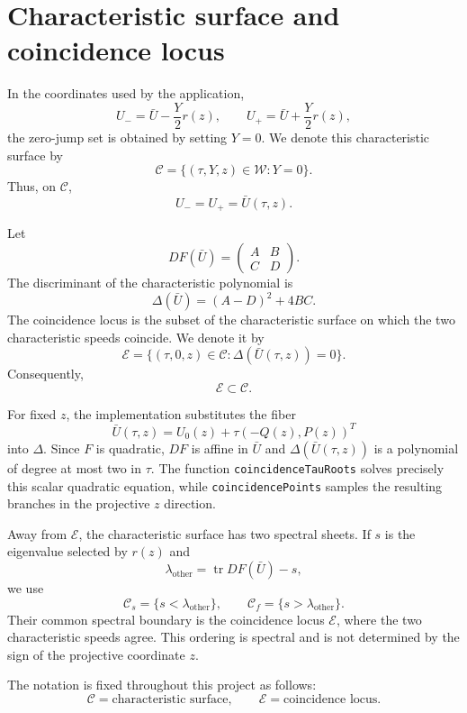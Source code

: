\section{Characteristic surface and coincidence locus}

In the coordinates used by the application,
\[
U_- = \bar U-\frac{Y}{2}r(z),
\qquad
U_+ = \bar U+\frac{Y}{2}r(z),
\]
the zero-jump set is obtained by setting $Y=0$. We denote this
characteristic surface by
\[
\boxed{\mathcal C=\{(\tau,Y,z)\in\mathcal W:Y=0\}}.
\]
Thus, on $\mathcal C$,
\[
U_-=U_+=\bar U(\tau,z).
\]

Let
\[
DF(\bar U)=
\begin{pmatrix}
A&B\\
C&D
\end{pmatrix}.
\]
The discriminant of the characteristic polynomial is
\[
\Delta(\bar U)=(A-D)^2+4BC.
\]
The coincidence locus is the subset of the characteristic surface on which
the two characteristic speeds coincide. We denote it by
\[
\boxed{\mathcal E=\{(\tau,0,z)\in\mathcal C:\Delta(\bar U(\tau,z))=0\}}.
\]
Consequently,
\[
\boxed{\mathcal E\subset\mathcal C}.
\]

For fixed $z$, the implementation substitutes the fiber
\[
\bar U(\tau,z)=U_0(z)+\tau(-Q(z),P(z))^T
\]
into $\Delta$. Since $F$ is quadratic, $DF$ is affine in $\bar U$ and
$\Delta(\bar U(\tau,z))$ is a polynomial of degree at most two in $\tau$.
The function \texttt{coincidenceTauRoots} solves precisely this scalar
quadratic equation, while \texttt{coincidencePoints} samples the resulting
branches in the projective $z$ direction.

Away from $\mathcal E$, the characteristic surface has two spectral sheets.
If $s$ is the eigenvalue selected by $r(z)$ and
\[
\lambda_{\mathrm{other}}=\operatorname{tr}DF(\bar U)-s,
\]
we use
\[
\mathcal C_s=\{s<\lambda_{\mathrm{other}}\},
\qquad
\mathcal C_f=\{s>\lambda_{\mathrm{other}}\}.
\]
Their common spectral boundary is the coincidence locus $\mathcal E$, where
the two characteristic speeds agree.  This ordering is spectral and is not
determined by the sign of the projective coordinate $z$.

The notation is fixed throughout this project as follows:
\[
\mathcal C=\text{characteristic surface},
\qquad
\mathcal E=\text{coincidence locus}.
\]
